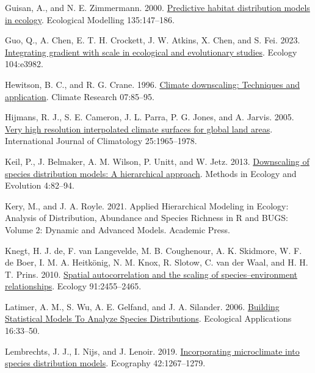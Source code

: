 \documentclass[
  12pt,
  a4paper]{article}
\newlength{\cslhangindent}
\newlength{\cslentryspacingunit} %
\newenvironment{CSLReferences}[2] %
 {%
  \setlength{\parindent}{0pt}
  \ifodd #1
  \let\oldpar\par
  \def\par{\hangindent=\cslhangindent\oldpar}
  \fi
  \setlength{\parskip}{#2\cslentryspacingunit}
 }%
 {}
\begin{document}
\begin{CSLReferences}{1}{0}
\leavevmode{}%
Guisan, A., and N. E. Zimmermann. 2000. \href{https://doi.org/10.1016/S0304-3800(00)00354-9}{Predictive habitat distribution models in ecology}. Ecological Modelling 135:147--186.

\leavevmode{}%
Guo, Q., A. Chen, E. T. H. Crockett, J. W. Atkins, X. Chen, and S. Fei. 2023. \href{https://doi.org/10.1002/ecy.3982}{Integrating gradient with scale in ecological and evolutionary studies}. Ecology 104:e3982.

\leavevmode{}%
Hewitson, B. C., and R. G. Crane. 1996. \href{https://doi.org/10.3354/cr007085}{Climate downscaling: Techniques and application}. Climate Research 07:85--95.

\leavevmode{}%
Hijmans, R. J., S. E. Cameron, J. L. Parra, P. G. Jones, and A. Jarvis. 2005. \href{https://doi.org/10.1002/joc.1276}{Very high resolution interpolated climate surfaces for global land areas}. International Journal of Climatology 25:1965--1978.

\leavevmode{}%
Keil, P., J. Belmaker, A. M. Wilson, P. Unitt, and W. Jetz. 2013. \href{https://doi.org/10.1111/j.2041-210x.2012.00264.x}{Downscaling of species distribution models: A hierarchical approach}. Methods in Ecology and Evolution 4:82--94.

\leavevmode{}%
Kery, M., and J. A. Royle. 2021. Applied {Hierarchical} {Modeling} in {Ecology}: {Analysis} of {Distribution}, {Abundance} and {Species} {Richness} in {R} and {BUGS}: {Volume} 2: {Dynamic} and {Advanced} {Models}. Academic Press.

\leavevmode{}%
Knegt, H. J. de, F. van Langevelde, M. B. Coughenour, A. K. Skidmore, W. F. de Boer, I. M. A. Heitkönig, N. M. Knox, R. Slotow, C. van der Waal, and H. H. T. Prins. 2010. \href{https://doi.org/10.1890/09-1359.1}{Spatial autocorrelation and the scaling of species--environment relationships}. Ecology 91:2455--2465.

\leavevmode{}%
Latimer, A. M., S. Wu, A. E. Gelfand, and J. A. Silander. 2006. \href{https://doi.org/10.1890/04-0609}{Building {Statistical} {Models} {To} {Analyze} {Species} {Distributions}}. Ecological Applications 16:33--50.

\leavevmode{}%
Lembrechts, J. J., I. Nijs, and J. Lenoir. 2019. \href{https://doi.org/10.1111/ecog.03947}{Incorporating microclimate into species distribution models}. Ecography 42:1267--1279.


\end{CSLReferences}
\end{document}
